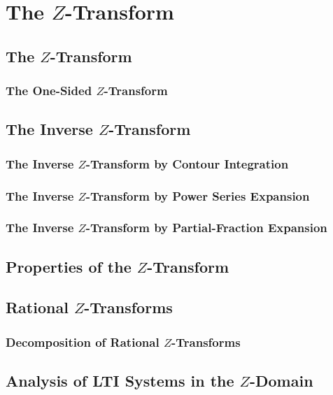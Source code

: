 \section{The $Z$-Transform}\label{sec:Z-Transform}
\subsection{The $Z$-Transform}\label{subsec:Z-Transform}
\subsubsection{The One-Sided $Z$-Transform}\label{subsubsec:One-Sided Z-Transform}
\subsection{The Inverse $Z$-Transform}\label{subsec:Inverse Z-Transform}
\subsubsection{The Inverse $Z$-Transform by Contour Integration}\label{subsubsec:Inverse Z-Transform by Contour Integration}
\subsubsection{The Inverse $Z$-Transform by Power Series Expansion}\label{subsubsec:Inverse Z-Transform by Power Series Expansion}
\subsubsection{The Inverse $Z$-Transform by Partial-Fraction Expansion}\label{subsubsec:Inverse Z-Transform by Partial-Fraction Expansion}
\subsection{Properties of the $Z$-Transform}\label{subsec:Z-Transform Properties}
\begin{propertylist}
\item 
\end{propertylist}

\subsection{Rational $Z$-Transforms}\label{subsec:Rational Z-Transforms}
\subsubsection{Decomposition of Rational $Z$-Transforms}\label{subsubsec:Decompose Rational Z-Transforms}

\subsection{Analysis of LTI Systems in the $Z$-Domain}\label{subsec:Analysis LTI Systems Z-Domain}

